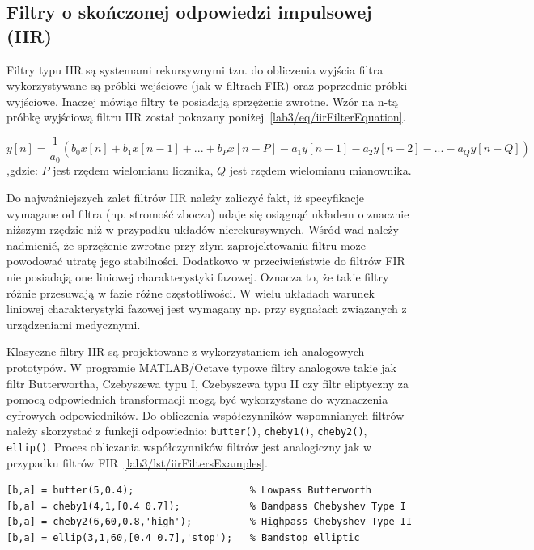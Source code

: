 \subsection{Filtry o skończonej odpowiedzi impulsowej (IIR)}
Filtry typu IIR są systemami rekursywnymi tzn. do obliczenia wyjścia filtra wykorzystywane są próbki wejściowe (jak w filtrach FIR) oraz poprzednie próbki wyjściowe. Inaczej mówiąc filtry te posiadają sprzężenie zwrotne. Wzór na n-tą próbkę wyjściową filtru IIR został pokazany poniżej~\ref{lab3/eq/iirFilterEquation}.

\begin{equation}\label{lab3/eq/iirFilterEquation}
	y[n] = \frac{1}{a_0} (b_0 x[n] + b_1 x[n-1] + ... + b_P x[n-P] - a_1 y[n-1] - a_2 y[n-2] - ... - a_Q y[n-Q])
\end{equation}
,gdzie: $P$ jest rzędem wielomianu licznika, $Q$ jest rzędem wielomianu mianownika.

Do najważniejszych zalet filtrów IIR należy zaliczyć fakt, iż specyfikacje wymagane od filtra (np. stromość zbocza) udaje się osiągnąć układem o znacznie niższym rzędzie niż w przypadku układów nierekursywnych. Wśród wad należy nadmienić, że sprzężenie zwrotne przy złym zaprojektowaniu filtru może powodować utratę jego stabilności. Dodatkowo w przeciwieństwie do filtrów FIR nie posiadają one liniowej charakterystyki fazowej. Oznacza to, że takie filtry różnie przesuwają w fazie różne częstotliwości. W wielu układach warunek liniowej charakterystyki fazowej jest wymagany np. przy sygnałach związanych z urządzeniami medycznymi.

Klasyczne filtry IIR są projektowane z wykorzystaniem ich analogowych prototypów. W programie MATLAB/Octave typowe filtry analogowe takie jak filtr Butterwortha, Czebyszewa typu I, Czebyszewa typu II czy filtr eliptyczny za pomocą odpowiednich transformacji mogą być wykorzystane do wyznaczenia cyfrowych odpowiedników. Do obliczenia współczynników wspomnianych filtrów należy skorzystać z funkcji odpowiednio: \texttt{butter()}, \texttt{cheby1()}, \texttt{cheby2()}, \texttt{ellip()}. Proces obliczania współczynników filtrów jest analogiczny jak w przypadku filtrów FIR~\ref{lab3/lst/iirFiltersExamples}. 

\begin{lstlisting}[caption=Przykłady filtrów rekursywnych, label=lab3/lst/iirFiltersExamples]
[b,a] = butter(5,0.4);                    % Lowpass Butterworth
[b,a] = cheby1(4,1,[0.4 0.7]);            % Bandpass Chebyshev Type I
[b,a] = cheby2(6,60,0.8,'high');          % Highpass Chebyshev Type II
[b,a] = ellip(3,1,60,[0.4 0.7],'stop');   % Bandstop elliptic
\end{lstlisting}


